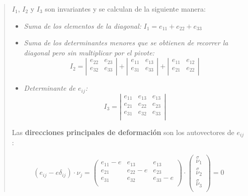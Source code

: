 \documentclass[a4paper,10pt,twoside,final,spanish]{article}
\begin{document}
\begin{quote}
\begin{enumerate}[a.]
$I_{1}$, $I_{2}$ y $I_{3}$ son invariantes y se calculan de la siguiente manera:

\begin{itemize}
\item \textit{Suma de los elementos de la diagonal: }$I_{1} = e_{11}+e_{22}+e_{33}$

\item \textit{Suma de los determinantes menores que se obtienen de recorrer la diagonal pero sin multiplicar por el pivote: }
\[
I_{2}=
\left|\begin{matrix}
e_{22} & e_{23} \\
e_{32} & e_{33} \\
\end{matrix}\right|
+
\left|\begin{matrix}
e_{11} & e_{13} \\
e_{31} & e_{33} \\
\end{matrix}\right|
+
\left|\begin{matrix}
e_{11} & e_{12} \\
e_{21} & e_{22} \\
\end{matrix}\right|
\]

\item \textit{Determinante de $e_{ij}$: }
\[
I_{3}=
\left|
\begin{matrix}
e_{11} & e_{13} & e_{13} \\
e_{21} & e_{22} & e_{23} \\
e_{31} & e_{32} & e_{33} \\
\end{matrix}
\right|
\]
\end{itemize}

Las \textbf{direcciones principales de deformación} son los autovectores de $e_{ij}$:

\[
(e_{ij}-e\delta_{ij})\cdot\nu_{j}=
\left(\begin{matrix}
e_{11}-e & e_{13} & e_{13} \\
e_{21} & e_{22}-e & e_{23} \\
e_{31} & e_{32} & e_{33}-e \\
\end{matrix}\right)\cdot
\left(\begin{matrix}
\stackrel \sigma \nu_{1} \\
\stackrel \sigma \nu_{2} \\
\stackrel \sigma \nu_{3} \\
\end{matrix}\right)=0
\]


\end{enumerate}
\end{quote}
\end{document}
